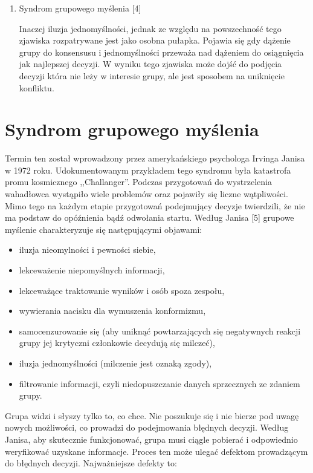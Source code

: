 \begin{enumerate}
  \item Syndrom grupowego myślenia [4]
  
  Inaczej iluzja jednomyślności, jednak ze względu na powszechność tego zjawiska
  rozpatrywane jest jako osobna pułapka. Pojawia się gdy dążenie grupy do 
  konsensusu i jednomyślności przeważa nad dążeniem do osiągnięcia jak 
  najlepszej decyzji. W wyniku tego zjawiska może dojść do podjęcia decyzji 
  która nie leży w interesie grupy, ale jest sposobem na uniknięcie konfliktu.

\end{enumerate}

\section{Syndrom grupowego myślenia}
Termin ten został wprowadzony przez amerykańskiego psychologa Irvinga Janisa w
1972 roku. Udokumentowanym przykładem tego syndromu była katastrofa promu
kosmicznego ,,Challanger''. Podczas przygotowań do wystrzelenia wahadłowca
wystąpiło wiele problemów oraz pojawiły się liczne wątpliwości. Mimo tego na
każdym  etapie przygotowań podejmujący decyzje twierdzili, że nie ma podstaw do 
opóźnienia bądź odwołania startu.
Według Janisa [5] grupowe myślenie charakteryzuje się następującymi objawami:

\begin{itemize}
  \item iluzja nieomylności i pewności siebie,
  \item lekceważenie niepomyślnych informacji,
  \item lekceważące traktowanie wyników i osób spoza zespołu,
  \item wywierania nacisku dla wymuszenia konformizmu,
  \item samocenzurowanie się (aby uniknąć powtarzających się negatywnych reakcji grupy jej krytyczni członkowie decydują się milczeć),
  \item iluzja jednomyślności (milczenie jest oznaką zgody),
  \item filtrowanie informacji, czyli niedopuszczanie danych sprzecznych ze
  zdaniem grupy.
\end{itemize}

Grupa widzi i słyszy tylko to, co chce. Nie poszukuje się i nie bierze pod uwagę 
nowych możliwości, co prowadzi do podejmowania błędnych decyzji. Według Janisa, 
aby skutecznie funkcjonować, grupa musi ciągle pobierać i odpowiednio weryfikować 
uzyskane informacje. Proces ten może ulegać defektom prowadzącym do błędnych decyzji. 
Najważniejsze defekty to:

